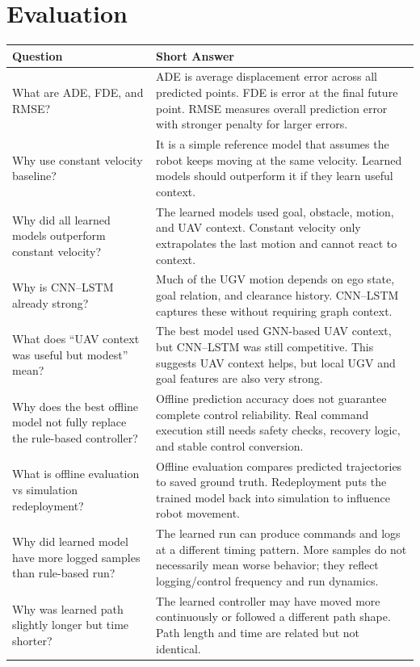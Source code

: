 \documentclass[11pt,a4paper]{article}
\begin{document}
\section*{Evaluation}
\begin{longtable}{QA}
\toprule
\textbf{Question} & \textbf{Short Answer} \\
\midrule
\endhead
What are ADE, FDE, and RMSE? &
ADE is average displacement error across all predicted points. FDE is error at the final future point. RMSE measures overall prediction error with stronger penalty for larger errors. \\
\addlinespace
Why use constant velocity baseline? &
It is a simple reference model that assumes the robot keeps moving at the same velocity. Learned models should outperform it if they learn useful context. \\
\addlinespace
Why did all learned models outperform constant velocity? &
The learned models used goal, obstacle, motion, and UAV context. Constant velocity only extrapolates the last motion and cannot react to context. \\
\addlinespace
Why is CNN--LSTM already strong? &
Much of the UGV motion depends on ego state, goal relation, and clearance history. CNN--LSTM captures these without requiring graph context. \\
\addlinespace
What does ``UAV context was useful but modest'' mean? &
The best model used GNN-based UAV context, but CNN--LSTM was still competitive. This suggests UAV context helps, but local UGV and goal features are also very strong. \\
\addlinespace
Why does the best offline model not fully replace the rule-based controller? &
Offline prediction accuracy does not guarantee complete control reliability. Real command execution still needs safety checks, recovery logic, and stable control conversion. \\
\addlinespace
What is offline evaluation vs simulation redeployment? &
Offline evaluation compares predicted trajectories to saved ground truth. Redeployment puts the trained model back into simulation to influence robot movement. \\
\addlinespace
Why did learned model have more logged samples than rule-based run? &
The learned run can produce commands and logs at a different timing pattern. More samples do not necessarily mean worse behavior; they reflect logging/control frequency and run dynamics. \\
\addlinespace
Why was learned path slightly longer but time shorter? &
The learned controller may have moved more continuously or followed a different path shape. Path length and time are related but not identical. \\
\bottomrule
\end{longtable}
\end{document}
